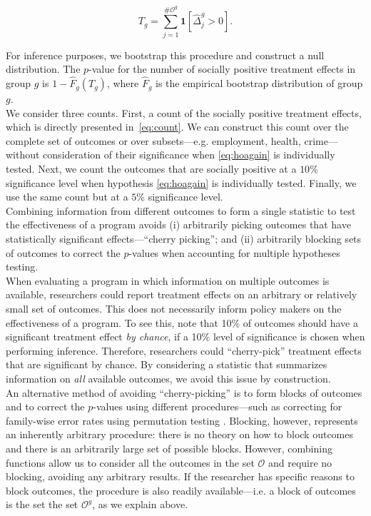 \begin{equation}
T_{g} = \sum _{j=1}^{\# \mathcal{O}^g} \mathbf{1} \left[ \widehat{\Delta}_{j}^{g} > 0\right]. \label{eq:count}
\end{equation} 

\noindent For inference purposes, we bootstrap this procedure and construct a null distribution. The $p$-value for the number of socially positive treatment effects in group $g$ is $1 - \widehat{F}_{g} \left( T_{g} \right)$, where $ \widehat{F}_{g}$ is the empirical bootstrap distribution of group $g$. \\

\noindent We consider three counts. First, a count of the socially positive treatment effects, which is directly presented in~\eqref{eq:count}. We can construct this count over the complete set of outcomes or over subsets---e.g. employment, health, crime---without consideration of their significance when \eqref{eq:hoagain} is individually tested. Next, we count the outcomes that are  socially positive at a $10\%$ significance level when hypothesis \eqref{eq:hoagain} is individually tested. Finally, we use the same count but at a $5\%$ significance level.\\

\noindent Combining information from different outcomes to form a single statistic to test the effectiveness of a program avoids (i) arbitrarily picking outcomes that have statistically significant effects---``cherry picking''; and (ii) arbitrarily blocking sets of outcomes to correct the $p$-values when accounting for multiple hypotheses testing.\\

\noindent When evaluating a program in which information on multiple outcomes is available, researchers could report treatment effects on an arbitrary or relatively small set of outcomes. This does not necessarily inform policy makers on the effectiveness of a program. To see this, note that 10\% of outcomes should have a significant treatment effect \textit{by chance}, if a 10\% level of significance is chosen when performing inference. Therefore, researchers could ``cherry-pick'' treatment effects that are significant by chance. By considering a statistic that summarizes information on \emph{all} available outcomes, we avoid this issue by construction.\\

\noindent An alternative method of avoiding ``cherry-picking'' is to form blocks of outcomes and to correct the $p$-values using different procedures---such as correcting for family-wise error rates using permutation testing \citep{Lehmann_Romano_2005_testing,Romano_Shaikh_2006_AnnStat,Heckman_Moon_etal_2010_QE}. Blocking, however, represents an inherently arbitrary procedure: there is no theory on how to block outcomes and there is an arbitrarily large set of possible blocks. However, combining functions allow us to consider all the outcomes in the set $\mathcal{O}$ and require no blocking, avoiding any arbitrary results. If the researcher has specific reasons to block outcomes, the procedure is also readily available---i.e. a block of outcomes is the set the set $\mathcal{O}^g$, as we explain above.\\

